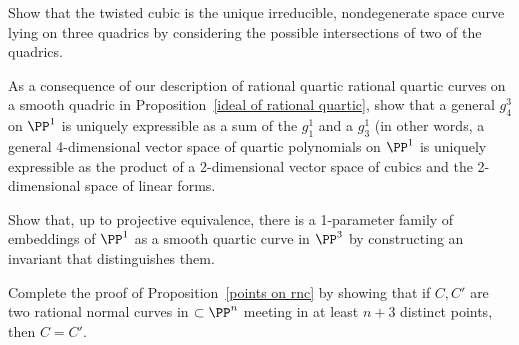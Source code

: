 \begin{exercise}
Show that the
twisted cubic
%
is the unique irreducible, nondegenerate space curve lying on three quadrics by considering the possible
intersections of two of the quadrics. 
\end{exercise}

\begin{exercise}\label{decomposition of a $g^3_4$}
As a consequence of our description of
rational quartic
rational quartic curves on a smooth quadric in Proposition~\ref{ideal of rational quartic},
show that a general $g^3_4$ on $\PP^1$ is uniquely expressible as a sum of the $g_1^1$ and a $g^1_3$
(in other words, a general 4-dimensional vector space of quartic polynomials on $\PP^1$ is uniquely expressible as the product of a 2-dimensional vector space of cubics and the 2-dimensional space of linear forms.
\end{exercise}

\begin{exercise}\label{distinguishing rational quartics}
Show that, up to projective equivalence, there is a 1-parameter family of embeddings of $\PP^1$ as a
smooth quartic curve in $\PP^3$
by constructing an invariant that distinguishes them.
\end{exercise}

\begin{exercise}\label{Castelnuovo uniqueness}
Complete the proof of Proposition~\ref{points on rnc} by showing that
if $C, C'$ are two rational normal curves in $\subset \PP^n$
meeting in at least $n+3$ distinct points, then $C = C'$.
\end{exercise}

